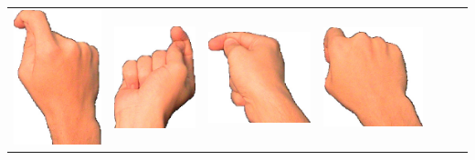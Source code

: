 \documentclass{article}
\begin{document}
\begin{center}
\begin{tabular}{r*{6}{c}}
\includegraphics[scale=0.1]{images/09-07-3.jpg}&
\includegraphics[scale=0.1]{images/09-07-4.jpg}&
\includegraphics[scale=0.1]{images/09-07-5.jpg}&
\includegraphics[scale=0.1]{images/09-07-6.jpg}\\

\end{tabular}
\end{center}
\end{document}
